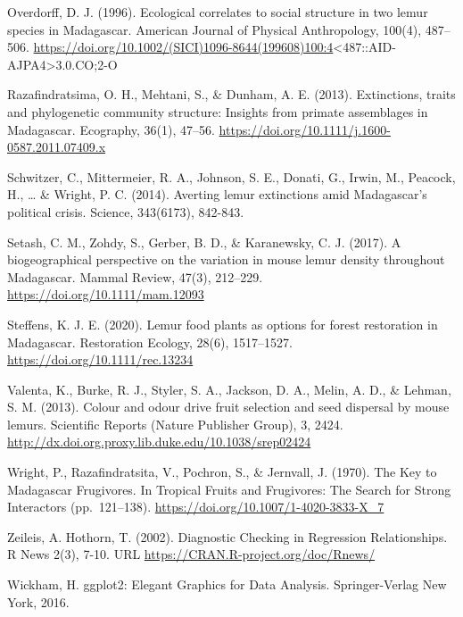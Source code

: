 \documentclass[
  12pt,
]{article}
\begin{document}
Overdorff, D. J. (1996). Ecological correlates to social structure in
two lemur species in Madagascar. American Journal of Physical
Anthropology, 100(4), 487--506.
\url{https://doi.org/10.1002/(SICI)1096-8644(199608)100:4}\textless487::AID-AJPA4\textgreater3.0.CO;2-O

Razafindratsima, O. H., Mehtani, S., \& Dunham, A. E. (2013).
Extinctions, traits and phylogenetic community structure: Insights from
primate assemblages in Madagascar. Ecography, 36(1), 47--56.
\url{https://doi.org/10.1111/j.1600-0587.2011.07409.x}

Schwitzer, C., Mittermeier, R. A., Johnson, S. E., Donati, G., Irwin,
M., Peacock, H., \ldots{} \& Wright, P. C. (2014). Averting lemur
extinctions amid Madagascar's political crisis. Science, 343(6173),
842-843.

Setash, C. M., Zohdy, S., Gerber, B. D., \& Karanewsky, C. J. (2017). A
biogeographical perspective on the variation in mouse lemur density
throughout Madagascar. Mammal Review, 47(3), 212--229.
\url{https://doi.org/10.1111/mam.12093}

Steffens, K. J. E. (2020). Lemur food plants as options for forest
restoration in Madagascar. Restoration Ecology, 28(6), 1517--1527.
\url{https://doi.org/10.1111/rec.13234}

Valenta, K., Burke, R. J., Styler, S. A., Jackson, D. A., Melin, A. D.,
\& Lehman, S. M. (2013). Colour and odour drive fruit selection and seed
dispersal by mouse lemurs. Scientific Reports (Nature Publisher Group),
3, 2424. \url{http://dx.doi.org.proxy.lib.duke.edu/10.1038/srep02424}

Wright, P., Razafindratsita, V., Pochron, S., \& Jernvall, J. (1970).
The Key to Madagascar Frugivores. In Tropical Fruits and Frugivores: The
Search for Strong Interactors (pp.~121--138).
\url{https://doi.org/10.1007/1-4020-3833-X_7}

Zeileis, A. Hothorn, T. (2002). Diagnostic Checking in Regression
Relationships. R News 2(3), 7-10. URL
\url{https://CRAN.R-project.org/doc/Rnews/}

Wickham, H. ggplot2: Elegant Graphics for Data Analysis. Springer-Verlag
New York, 2016.
\end{document}
